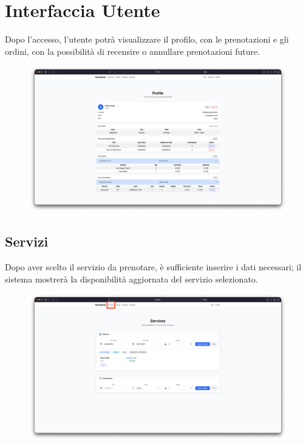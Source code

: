\documentclass[a4paper,12pt]{report}
\begin{document}
\newpage
\section{Interfaccia Utente}
Dopo l'accesso, l'utente potrà visualizzare il profilo, con le
prenotazioni e gli ordini, con
la possibilità di recensire o annullare prenotazioni future.

\begin{figure}[H]
  \centering
  \includegraphics[width=\textwidth, trim=0 0 0 0]{./img/users/profile.png}
  \vspace{-1em}
  \label{fig:profile}
\end{figure}

\subsection*{Servizi}
Dopo aver scelto il servizio da prenotare, è sufficiente inserire i
dati necessari; il sistema
mostrerà la disponibilità aggiornata del servizio selezionato.

\begin{figure}[H]
  \centering
  \includegraphics[width=\textwidth, trim=0 0 0 0]{./img/users/services.png}
  \vspace{-1em}
  \label{fig:services}
\end{figure}
\end{document}
